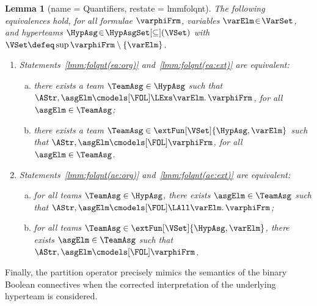 \documentclass[authoryear]{elsarticle}
\newtheorem{lemma}{Lemma}
\begin{document}
\begin{lemma}[name = \FOL Quantifiers, restate = lmmfolqnt]
  \label{lmm:folqnt}
  The following equivalences hold, for all \FOL formulae $\varphiFrm$, variables
  $\varElm \!\in\! \VarSet$, and hyperteams $\HypAsg \!\in\!
  \HypAsgSet[\subseteq](\VSet)$ with $\VSet \defeq \sup{\varphiFrm} \setminus \{
  \varElm \}$.
  \begin{enumerate}[1)]
    \item\label{lmm:folqnt(ea)}
      Statements~\ref{lmm:folqnt(ea:org)} and~\ref{lmm:folqnt(ea:ext)} are
      equivalent:
      \begin{enumerate}[a)]
        \item\label{lmm:folqnt(ea:org)}
          there exists a team $\TeamAsg \in \HypAsg$ such that $\AStr, \asgElm
          \cmodels[\FOL] \LExs \varElm \ldotp \varphiFrm$, for all $\asgElm \in
          \TeamAsg$;
        \item\label{lmm:folqnt(ea:ext)}
          there exists a team $\TeamAsg \in \extFun[\VSet]{\HypAsg, \varElm}$
          such that $\AStr, \asgElm \cmodels[\FOL] \varphiFrm$, for all $\asgElm
          \in \TeamAsg$.
      \end{enumerate}
    \item\label{lmm:folqnt(ae)}
      Statements~\ref{lmm:folqnt(ae:org)} and~\ref{lmm:folqnt(ae:ext)} are
      equivalent:
      \begin{enumerate}[a)]
        \item\label{lmm:folqnt(ae:org)}
          for all teams $\TeamAsg \in \HypAsg$, there exists $\asgElm \in
          \TeamAsg$ such that $\AStr, \asgElm \cmodels[\FOL] \LAll \varElm
          \ldotp \varphiFrm$;
        \item\label{lmm:folqnt(ae:ext)}
          for all teams $\TeamAsg \in \extFun[\VSet]{\HypAsg, \varElm}$, there
          exists $\asgElm \in \TeamAsg$ such that $\AStr, \asgElm \cmodels[\FOL]
          \varphiFrm$.
      \end{enumerate}
  \end{enumerate}
\end{lemma}

Finally, the partition operator precisely mimics the semantics of the binary
Boolean connectives when the corrected interpretation of the underlying
hyperteam is considered.
\end{document}
